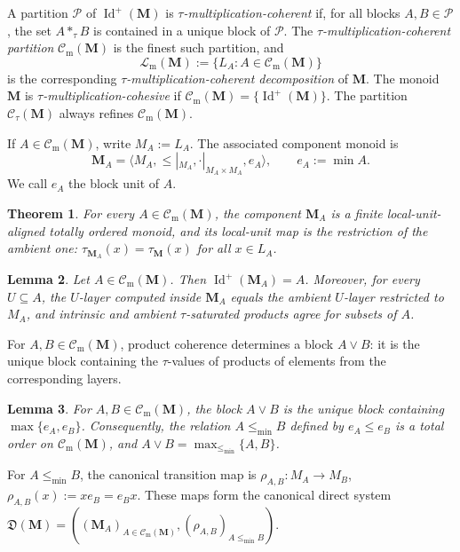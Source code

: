 \documentclass[pdflatex,sn-mathphys-num]{sn-jnl}
\theoremstyle{thmstyleone}%
\newtheorem{theorem}{Theorem}[section]
\newtheorem{lemma}[theorem]{Lemma}
\theoremstyle{thmstyletwo}%
\theoremstyle{thmstylethree}%
\newcommand{\PosId}{\operatorname{Id}^{+}}
\newcommand{\tprod}[2]{#1\ast_{\tau}#2}
\newcommand{\layer}[1]{L_{#1}}
\newcommand{\Ctau}{\mathcal C_{\tau}}
\newcommand{\Cm}{\mathcal C_{\mathrm m}}
\newcommand{\Lm}{\mathcal L_{\mathrm m}}
\begin{document}
A partition \(\mathcal P\) of \(\PosId(\mathbf M)\) is \emph{\(\tau\)-multiplication-coherent} if, for all blocks \(A,B\in\mathcal P\), the set \(\tprod{A}{B}\) is contained in a unique block of \(\mathcal P\).
The \emph{\(\tau\)-multiplication-coherent partition} \(\Cm(\mathbf M)\) is the finest such partition, and
\[
\Lm(\mathbf M):=\{\layer{A}:A\in\Cm(\mathbf M)\}
\]
is the corresponding \emph{\(\tau\)-multiplication-coherent decomposition} of \(\mathbf M\).
The monoid \(\mathbf M\) is \emph{\(\tau\)-multiplication-cohesive} if \(\Cm(\mathbf M)=\{\PosId(\mathbf M)\}\).
The partition \(\Ctau(\mathbf M)\) always refines \(\Cm(\mathbf M)\).

If \(A\in\Cm(\mathbf M)\), write \(M_A:=\layer{A}\).
The associated component monoid is
\[
\mathbf M_A=\langle M_A,\le|_{M_A},\cdot|_{M_A\times M_A},e_A\rangle,
\qquad
e_A:=\min A.
\]
We call \(e_A\) the block unit of \(A\).

\begin{theorem}\label{thm:component-local-unit-aligned-monoid}
For every \(A\in\Cm(\mathbf M)\), the component \(\mathbf M_A\) is a finite local-unit-aligned totally ordered monoid, and its local-unit map is the restriction of the ambient one: \(\tau_{\mathbf M_A}(x)=\tau_{\mathbf M}(x)\) for all \(x\in \layer{A}\).
\end{theorem}

\begin{lemma}\label{lem:intrinsic-tau-on-component}
Let \(A\in\Cm(\mathbf M)\).
Then \(\PosId(\mathbf M_A)=A\).
Moreover, for every \(U\subseteq A\), the \(U\)-layer computed inside \(\mathbf M_A\) equals the ambient \(U\)-layer restricted to \(M_A\), and intrinsic and ambient \(\tau\)-saturated products agree for subsets of \(A\).
\end{lemma}

For \(A,B\in\Cm(\mathbf M)\), product coherence determines a block \(A\vee B\): it is the unique block containing the \(\tau\)-values of products of elements from the corresponding layers.

\begin{lemma}\label{lem:block-join-min}
For \(A,B\in\Cm(\mathbf M)\), the block \(A\vee B\) is the unique block containing \(\max\{e_A,e_B\}\).
Consequently, the relation \(A\le_{\min}B\) defined by \(e_A\le e_B\) is a total order on \(\Cm(\mathbf M)\), and \(A\vee B=\max_{\le_{\min}}\{A,B\}\).
\end{lemma}

For \(A\le_{\min}B\), the canonical transition map is \(\rho_{A,B}\colon M_A\to M_B\), \(\rho_{A,B}(x):=xe_B=e_Bx\).
These maps form the canonical direct system \(\mathfrak D(\mathbf M)=((\mathbf M_A)_{A\in\Cm(\mathbf M)},(\rho_{A,B})_{A\le_{\min}B})\).
\end{document}

